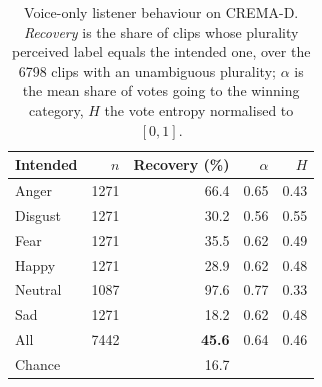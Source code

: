 \begin{table}[t]
\centering
\caption{Voice-only listener behaviour on CREMA-D. \emph{Recovery} is the share of clips whose plurality perceived label equals the intended one, over the 6798 clips with an unambiguous plurality; $\alpha$ is the mean share of votes going to the winning category, $H$ the vote entropy normalised to $[0,1]$.}
\label{tab:audit}
\small
\begin{tabular}{lrrrr}
\hline
Intended & $n$ & Recovery (\%) & $\alpha$ & $H$ \\
\hline
Anger & 1271 & 66.4 & 0.65 & 0.43 \\
Disgust & 1271 & 30.2 & 0.56 & 0.55 \\
Fear & 1271 & 35.5 & 0.62 & 0.49 \\
Happy & 1271 & 28.9 & 0.62 & 0.48 \\
Neutral & 1087 & 97.6 & 0.77 & 0.33 \\
Sad & 1271 & 18.2 & 0.62 & 0.48 \\
\hline
All & 7442 & \textbf{45.6} & 0.64 & 0.46 \\
Chance &  & 16.7 &  &  \\
\hline
\end{tabular}
\vspace{-4mm}
\end{table}
